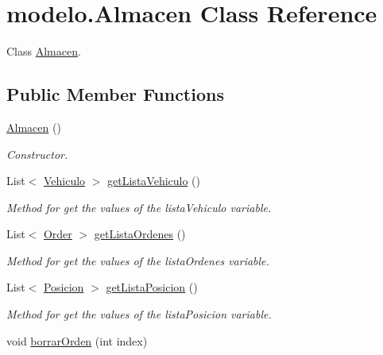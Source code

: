 \hypertarget{classmodelo_1_1_almacen}{}\section{modelo.\+Almacen Class Reference}
\label{classmodelo_1_1_almacen}


Class \mbox{\hyperlink{classmodelo_1_1_almacen}{Almacen}}.  


\subsection*{Public Member Functions}
\begin{DoxyCompactItemize}
\item 
\mbox{\label{classmodelo_1_1_almacen_ae1ad022e6ece480ad3dcb703b0fbbcf1}} 
\mbox{\hyperlink{classmodelo_1_1_almacen_ae1ad022e6ece480ad3dcb703b0fbbcf1}{Almacen}} ()
\begin{DoxyCompactList}\small\item\em Constructor. \end{DoxyCompactList}\item 
List$<$ \mbox{\hyperlink{classmodelo_1_1_vehiculo}{Vehiculo}} $>$ \mbox{\hyperlink{classmodelo_1_1_almacen_ad20ed6c1d6abf54fcda8bb94b6900862}{get\+Lista\+Vehiculo}} ()
\begin{DoxyCompactList}\small\item\em Method for get the values of the lista\+Vehiculo variable. \end{DoxyCompactList}\item 
List$<$ \mbox{\hyperlink{classmodelo_1_1_order}{Order}} $>$ \mbox{\hyperlink{classmodelo_1_1_almacen_ad87095e4794081d98d8e77935a54f311}{get\+Lista\+Ordenes}} ()
\begin{DoxyCompactList}\small\item\em Method for get the values of the lista\+Ordenes variable. \end{DoxyCompactList}\item 
List$<$ \mbox{\hyperlink{classmodelo_1_1_posicion}{Posicion}} $>$ \mbox{\hyperlink{classmodelo_1_1_almacen_a5f549eec4b4dec51453b913a0c00de53}{get\+Lista\+Posicion}} ()
\begin{DoxyCompactList}\small\item\em Method for get the values of the lista\+Posicion variable. \end{DoxyCompactList}\item 
void \mbox{\hyperlink{classmodelo_1_1_almacen_a9703cc134fcb9dc29e9aeb777bd0ee23}{borrar\+Orden}} (int index)

\end{DoxyCompactItemize}

